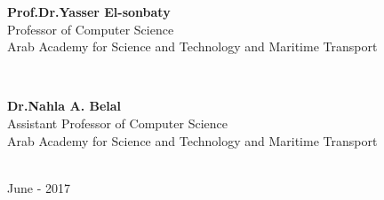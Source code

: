 \documentclass[12pt]{llncs}
\begin{document}
{\begin{titlepage}
\begin{minipage}{0.45\textwidth}
\begin{flushleft}
\center
{\large \bfseries Prof.Dr.Yasser El-sonbaty}\\
{\small Professor of Computer Science}\\
{\small Arab Academy for Science and Technology and Maritime Transport}
\end{flushleft}
\end{minipage}
~
\begin{minipage}{0.47\textwidth}
\begin{flushright}
\center
{\large \bfseries Dr.Nahla A. Belal}\\
{\small Assistant Professor of Computer Science}\\
{\small Arab Academy for Science and Technology and Maritime Transport}
\end{flushright}
\end{minipage}\\[0.2cm]
{\small June - 2017}\\[0cm] 
\vfill %
\end{titlepage}
}

\end{document}
